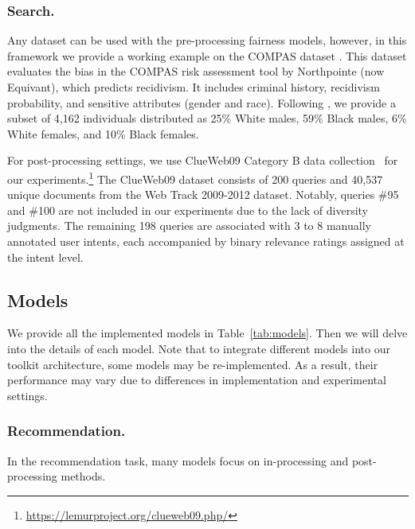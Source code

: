 \subsubsection{Search.} 
Any dataset can be used with the pre-processing fairness models, however, in this framework we provide a working example on the COMPAS dataset \cite{bias2016there}. This dataset evaluates the bias in the COMPAS risk assessment tool by Northpointe (now Equivant), which predicts recidivism. It includes criminal history, recidivism probability, and sensitive attributes (gender and race). Following \cite{yang2020causal}, we provide a subset of 4,162 individuals distributed as 25\% White males, 59\% Black males, 6\% White females, and 10\% Black females.


For post-processing settings, we use ClueWeb09 Category B data collection~\cite{clueweb09_09_data} for our experiments.\footnote{\url{https://lemurproject.org/clueweb09.php/}} The ClueWeb09 dataset consists of 200 queries and 40,537 unique documents from the Web Track 2009-2012 dataset. Notably, queries \#95 and \#100 are not included in our experiments due to the lack of diversity judgments. The remaining 198 queries are associated with 3 to 8 manually annotated user intents, each accompanied by binary relevance ratings assigned at the intent level. %


\subsection{Models}\label{sec:models}
We provide all the implemented models in Table~\ref{tab:models}. Then we will delve into the details of each model. Note that to integrate different models into our toolkit architecture, some models may be re-implemented. As a result, their performance may vary due to differences in implementation and experimental settings.

\subsubsection{Recommendation.}
In the recommendation task, many models focus on in-processing and post-processing methods.

